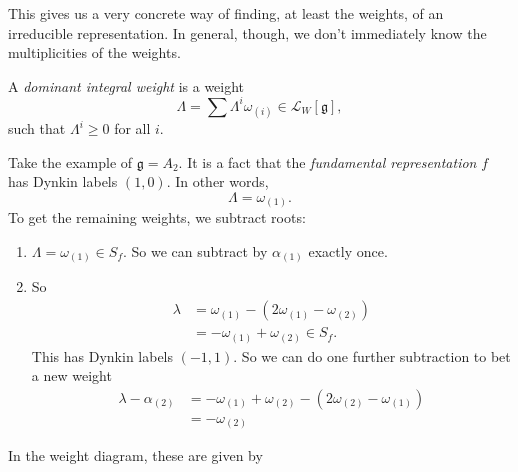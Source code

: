 \documentclass[a4paper]{article}
\begin{document}
This gives us a very concrete way of finding, at least the weights, of an irreducible representation. In general, though, we don't immediately know the multiplicities of the weights.

\begin{defi}
  A \emph{dominant integral weight} is a weight
  \[
    \Lambda = \sum \Lambda^i \omega_{(i)} \in \mathcal{L}_W[\mathfrak{g}],
  \]
  such that $\Lambda^i \geq 0$ for all $i$.
\end{defi}

\begin{eg}
  Take the example of $\mathfrak{g} = A_2$. It is a fact that the \emph{fundamental representation} $f$ has Dynkin labels $(1, 0)$. In other words,
  \[
    \Lambda = \omega_{(1)}.
  \]
  To get the remaining weights, we subtract roots:
  \begin{enumerate}
    \item $\Lambda = \omega_{(1)} \in S_f$. So we can subtract by $\alpha_{(1)}$ exactly once.
    \item So
      \begin{align*}
        \lambda &= \omega_{(1)} - (2 \omega_{(1)} - \omega_{(2)}) \\
        &= - \omega_{(1)} + \omega_{(2)} \in S_f.
      \end{align*}
      This has Dynkin labels $(-1, 1)$. So we can do one further subtraction to bet a new weight
      \begin{align*}
        \lambda - \alpha_{(2)} &= - \omega_{(1)} + \omega_{(2)} - (2 \omega_{(2)} - \omega_{(1)})\\
        &= -\omega_{(2)}
      \end{align*}
  \end{enumerate}
  In the weight diagram, these are given by
  \begin{center}
\end{center}
\end{eg}
\end{document}
